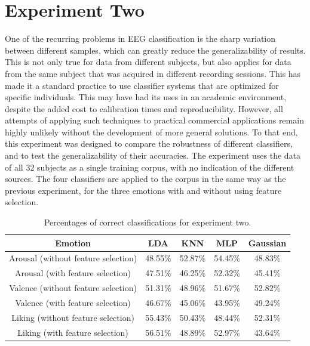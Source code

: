 \documentclass[12pt, a4paper, fleqn]{memoir}%
\begin{document}
\section{Experiment Two}
\label{sec:exp2}
One of the recurring problems in EEG classification is the sharp variation between different samples, which can greatly reduce the generalizability of results. This is not only true for data from different subjects, but also applies for data from the same subject that was acquired in different recording sessions. This has made it a standard practice to use classifier systems that are optimized for specific individuals. This may have had its uses in an academic environment, despite the added cost to calibration times and reproducibility. However, all attempts of applying such techniques to practical commercial applications remain highly unlikely without the development of more general solutions. To that end, this experiment was designed to compare the robustness of different classifiers, and to test the generalizability of their accuracies. The experiment uses the data of all 32 subjects as a single training corpus, with no indication of the different sources. The four classifiers are applied to the corpus in the same way as the previous experiment, for the three emotions with and without using feature selection.

\begin{table}[h]
	\begin{tabular}{| c | c | c | c | c |}
		\hline \hline
		Emotion 				& LDA     & KNN     & MLP     & Gaussian \\
		\hline \hline
		Arousal (without feature selection)     & 48.55\% & 52.87\% & 54.45\% & 48.83\%  \\ \hline
		Arousal (with feature selection)	& 47.51\% & 46.25\% & 52.32\% & 45.41\%  \\ \hline
		\hline
		Valence (without feature selection)	& 51.31\% & 48.96\% & 51.67\% & 52.82\%  \\ \hline
		Valence (with feature selection)   	& 46.67\% & 45.06\% & 43.95\% & 49.24\%  \\ \hline
		\hline
		Liking  (without feature selection) 	& 55.43\% & 50.43\% & 48.44\% & 52.31\%  \\ \hline
		Liking  (with feature selection)     	& 56.51\% & 48.89\% & 52.97\% & 43.64\%  \\ \hline
		\hline
	\end{tabular}
	\caption{Percentages of correct classifications for experiment two.}
	\label{table:exp2}
\end{table}
\end{document}
